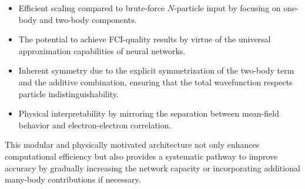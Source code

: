 \begin{itemize}
  \item Efficient scaling compared to brute-force \(N\)-particle input by focusing on one-body and two-body components.
  \item The potential to achieve FCI-quality results by virtue of the universal approximation capabilities of neural networks.
  \item Inherent symmetry due to the explicit symmetrization of the two-body term and the additive combination, ensuring that the total wavefunction respects particle indistinguishability.
  \item Physical interpretability by mirroring the separation between mean-field behavior and electron-electron correlation.
\end{itemize}

This modular and physically motivated architecture not only enhances computational efficiency but also provides a systematic pathway to improve accuracy by gradually increasing the network capacity or incorporating additional many-body contributions if necessary.
